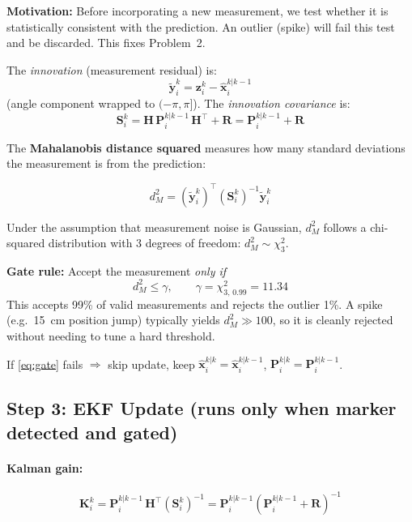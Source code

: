\documentclass[12pt,a4paper]{article}
\begin{document}
\textbf{Motivation:} Before incorporating a new measurement, we test whether it
is statistically consistent with the prediction. An outlier (spike) will fail
this test and be discarded. This fixes Problem~2.

The \emph{innovation} (measurement residual) is:
\begin{equation}
  \tilde{\bm{y}}_i^k = \bm{z}_i^k - \hat{\bm{x}}_i^{k|k-1}
  \label{eq:innov}
\end{equation}
(angle component wrapped to $(-\pi,\pi]$). The \emph{innovation covariance} is:
\begin{equation}
  \bm{S}_i^k = \bm{H}\,\bm{P}_i^{k|k-1}\,\bm{H}^\top + \bm{R}
             = \bm{P}_i^{k|k-1} + \bm{R}
  \label{eq:S}
\end{equation}

The \textbf{Mahalanobis distance squared} measures how many standard deviations
the measurement is from the prediction:
\begin{mathbox}
\begin{equation}
  d_M^2 = \left(\tilde{\bm{y}}_i^k\right)^\top \left(\bm{S}_i^k\right)^{-1} \tilde{\bm{y}}_i^k
  \label{eq:maha}
\end{equation}
\end{mathbox}

Under the assumption that measurement noise is Gaussian, $d_M^2$ follows a
chi-squared distribution with 3 degrees of freedom: $d_M^2 \sim \chi^2_3$.

\textbf{Gate rule:} Accept the measurement \emph{only if}
\begin{equation}
  d_M^2 \leq \gamma, \qquad \gamma = \chi^2_{3,\,0.99} = 11.34
  \label{eq:gate}
\end{equation}
This accepts 99\% of valid measurements and rejects the outlier 1\%.
A spike (e.g.\ 15~cm position jump) typically yields $d_M^2 \gg 100$, so it is
cleanly rejected without needing to tune a hard threshold.

If \eqref{eq:gate} fails $\Rightarrow$ skip update, keep
$\hat{\bm{x}}_i^{k|k} = \hat{\bm{x}}_i^{k|k-1}$,
$\bm{P}_i^{k|k} = \bm{P}_i^{k|k-1}$.

\subsection{Step 3: EKF Update (runs only when marker detected and gated)}
\label{sec:update}

\paragraph{Kalman gain:}
\begin{mathbox}
\begin{equation}
  \bm{K}_i^k = \bm{P}_i^{k|k-1}\,\bm{H}^\top \left(\bm{S}_i^k\right)^{-1}
             = \bm{P}_i^{k|k-1} \left(\bm{P}_i^{k|k-1} + \bm{R}\right)^{-1}
  \label{eq:K}
\end{equation}
\end{mathbox}
\end{document}
